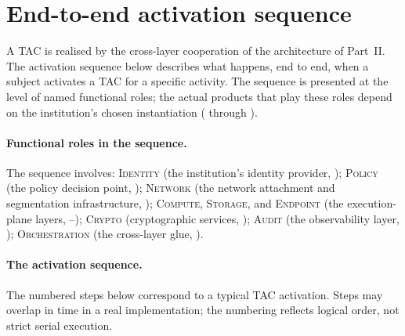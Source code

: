 \section{End-to-end activation sequence}
\label{sec:cf-activation-sequence}

A TAC is realised by the cross-layer cooperation of the
architecture of Part~II. The activation sequence below describes
what happens, end to end, when a subject activates a TAC for a
specific activity. The sequence is presented at the level of
named functional roles; the actual products that play these
roles depend on the institution's chosen instantiation
( through ).

\paragraph{Functional roles in the sequence.} The sequence
involves: \textsc{Identity} (the institution's identity provider,
); \textsc{Policy} (the policy decision
point, ); \textsc{Network} (the network
attachment and segmentation infrastructure,
); \textsc{Compute}, \textsc{Storage}, and
\textsc{Endpoint} (the execution-plane layers,
--);
\textsc{Crypto} (cryptographic services,
); \textsc{Audit} (the observability layer,
); \textsc{Orchestration} (the
cross-layer glue, ).

\paragraph{The activation sequence.} The numbered steps below
correspond to a typical TAC activation. Steps may overlap in time
in a real implementation; the numbering reflects logical order,
not strict serial execution.

